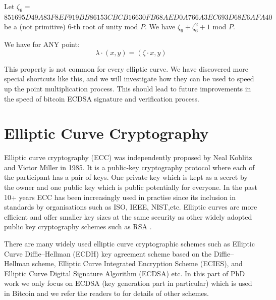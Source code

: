 Let
$\zeta_6 =$\\
$ 851695D49A83F8EF919BB86153CBCB16630FB68AED0A766A3EC693D68E6AFA40$
be a (not primitive) 6-th root of unity mod $P$.
We have $\zeta_6+\zeta_6^2+1$ mod $P$.


%



We have for ANY point:
$$
\lambda\cdot (x,y) = (\zeta\cdot x,y)
$$

This property is not common for every elliptic curve. We have discovered more special shortcuts like this, and we will investigate how they can be used to speed up the point multiplication process. This should lead to future improvements in the speed of bitcoin ECDSA signature and verification process.

\section{Elliptic Curve Cryptography}
Elliptic curve cryptography (ECC) was independently proposed by Neal Koblitz\cite{koblitz1987elliptic} and Victor Miller in 1985. It is a public-key cryptography protocol where each of the participant has a pair of keys. One private key which is kept as a secret by the owner and one public key which is public potentially for everyone. In the past 10+ years ECC has been increasingly used in practise since its inclusion in standards by organisations such as ISO, IEEE, NIST,etc. Elliptic curves are more efficient \cite{bernstein2009ebacs} and offer smaller key sizes \cite{lenstra2001selecting} at the same security as other widely adopted public key cryptography schemes such as RSA \cite{rivest1978method}. 

There are many widely used elliptic curve cryptographic schemes such as Elliptic Curve Diffie–Hellman (ECDH) key agreement scheme based on the Diffie–Hellman scheme, Elliptic Curve Integrated Encryption Scheme (ECIES), and Elliptic Curve Digital Signature Algorithm (ECDSA) etc. In this part of PhD work we only focus on ECDSA \cite{johnson2001elliptic} (key generation part in particular) which is used in Bitcoin and we refer the readers to \cite{hankerson2006guide} for details of other schemes.

